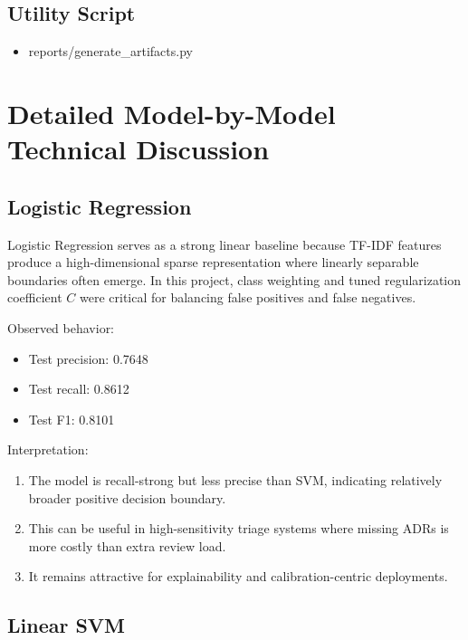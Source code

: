 \documentclass[11pt]{article}
\begin{document}
\subsection{Utility Script}

\begin{itemize}
  \item reports/generate\_artifacts.py
\end{itemize}

\section{Detailed Model-by-Model Technical Discussion}

\subsection{Logistic Regression}

Logistic Regression serves as a strong linear baseline because TF-IDF features produce a high-dimensional sparse representation where linearly separable boundaries often emerge. In this project, class weighting and tuned regularization coefficient $C$ were critical for balancing false positives and false negatives.


Observed behavior:


\begin{itemize}
  \item Test precision: 0.7648
  \item Test recall: 0.8612
  \item Test F1: 0.8101
\end{itemize}

Interpretation:


\begin{enumerate}
  \item The model is recall-strong but less precise than SVM, indicating relatively broader positive decision boundary.
  \item This can be useful in high-sensitivity triage systems where missing ADRs is more costly than extra review load.
  \item It remains attractive for explainability and calibration-centric deployments.
\end{enumerate}

\subsection{Linear SVM}
\end{document}
